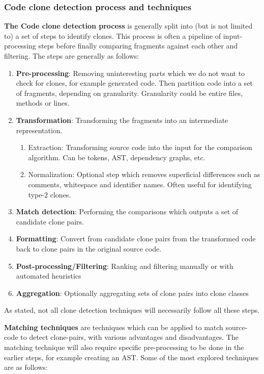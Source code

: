 \documentclass[12pt]{article}
\begin{document}
\subsubsection{Code clone detection process and techniques}

\textbf{The Code clone detection process} is generally split into (but is not limited to)
a set of steps to identify clones\cite{Inoue_introduction_to_cc}. This
process is often a pipeline of input-processing steps before finally comparing fragments
against each other and filtering. The steps are generally as follows:

\begin{enumerate}
	\item \textbf{Pre-processing}: Removing uninteresting parts which we do not want to
	      check for clones, for example generated code. Then partition code into a set of
	      fragments, depending on granularity. Granularity could be entire files, methods or lines.
	\item \textbf{Transformation}: Transforming the fragments into an intermediate representation.
	      \begin{enumerate}
		      \item Extraction: Transforming source code into the input for the comparison
		            algorithm. Can be tokens, AST, dependency graphs, etc.
		      \item Normalization: Optional step which removes superficial differences such as
		            comments, whitespace and identifier names. Often useful for identifying type-2
		            clones.
	      \end{enumerate}
	\item \textbf{Match detection}: Performing the comparisons which outputs a set of
	      candidate clone pairs.
	\item \textbf{Formatting}: Convert from candidate clone pairs from the transformed
	      code back to clone pairs in the original source code.
	\item \textbf{Post-processing/Filtering}: Ranking and filtering manually or with
	      automated heuristics
	\item \textbf{Aggregation}: Optionally aggregating sets of clone pairs into clone classes
\end{enumerate}

As stated, not all clone detection techniques will necessarily follow all these steps.

\textbf{Matching techniques} are techniques which can be applied to match source-code to
detect clone-pairs, with various advantages and disadvantages. The matching technique will
also require specific pre-processing to be done in the earlier steps, for example creating an
AST. Some of the most explored techniques are as follows\cite{ComparisonAndEvaluationOfTechniques}:
\end{document}
